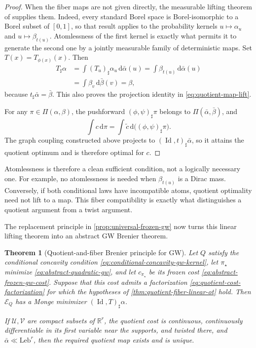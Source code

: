 \documentclass[11pt,a4paper]{article}
\newtheorem{theorem}{Theorem}[section]
\theoremstyle{definition}
\theoremstyle{remark}
\newcommand{\R}{\mathbb R}
\newcommand{\Ecal}{\mathcal E}
\newcommand{\Piopt}{\Pi}
\newcommand{\Id}{\operatorname{Id}}
\newcommand{\dd}{\,\mathrm d}
\begin{document}
\begin{proof}
When the fiber maps are not given directly, the measurable lifting theorem of
\citet[Theorem~2.1]{DumontLacombeVialard2025} supplies them.  Indeed, every
standard Borel space is Borel-isomorphic to a Borel subset of \([0,1]\), so
that result applies to the probability kernels
\(u\mapsto\alpha_u\) and \(u\mapsto\beta_{t(u)}\).  Atomlessness of the first
kernel is exactly what permits it to generate the second one by a jointly
measurable family of deterministic maps.  Set
\(T(x)=T_{\phi(x)}(x)\).  Then
\begin{align*}
  T_\sharp\alpha
  &=\int (T_u)_\sharp\alpha_u\dd\bar\alpha(u)
    =\int\beta_{t(u)}\dd\bar\alpha(u)\\
  &=\int\beta_v\dd\bar\beta(v)=\beta,
\end{align*}
because \(t_\sharp\bar\alpha=\bar\beta\).  This also proves the projection
identity in \eqref{eq:quotient-map-lift}.

For any \(\pi\in\Piopt(\alpha,\beta)\), the pushforward
\((\phi,\psi)_\sharp\pi\) belongs to
\(\Piopt(\bar\alpha,\bar\beta)\), and
\begin{equation*}
  \int c\dd\pi
  =\int\widetilde c\dd\bigl((\phi,\psi)_\sharp\pi\bigr).
\end{equation*}
The graph coupling constructed above projects to
\((\Id,t)_\sharp\bar\alpha\), so it attains the quotient optimum and is
therefore optimal for \(c\).
\end{proof}

Atomlessness is therefore a clean sufficient condition, not a logically
necessary one.  For example, no atomlessness is needed when
\(\beta_{t(u)}\) is a Dirac mass.  Conversely, if both conditional laws have
incompatible atoms, quotient optimality need not lift to a map.  This fiber
compatibility is exactly what distinguishes a quotient argument from a twist
argument.

The replacement principle in \cref{prop:universal-frozen-gw} now turns this
linear lifting theorem into an abstract GW Brenier theorem.

\begin{theorem}[Quotient-and-fiber Brenier principle for GW]
\label{thm:quotient-fiber-gw}
Let \(Q\) satisfy the conditional concavity condition
\eqref{eq:conditional-concavity-gw-kernel}, let \(\pi_\star\) minimize
\eqref{eq:abstract-quadratic-gw}, and let \(c_{\pi_\star}\) be its frozen
cost \eqref{eq:abstract-frozen-gw-cost}.  Suppose that this cost admits a
factorization \eqref{eq:quotient-cost-factorization} for which the hypotheses
of \cref{thm:quotient-fiber-linear-ot} hold.  Then \(\Ecal_Q\) has a Monge
minimizer \((\Id,T)_\sharp\alpha\).

If \(\mathcal U,\mathcal V\) are compact subsets of \(\R^r\), the quotient
cost is continuous, continuously differentiable in its first variable near
the supports, and twisted there, and
\(\bar\alpha\ll\mathrm{Leb}^r\), then the required quotient map exists and
is unique.
\end{theorem}
\end{document}
